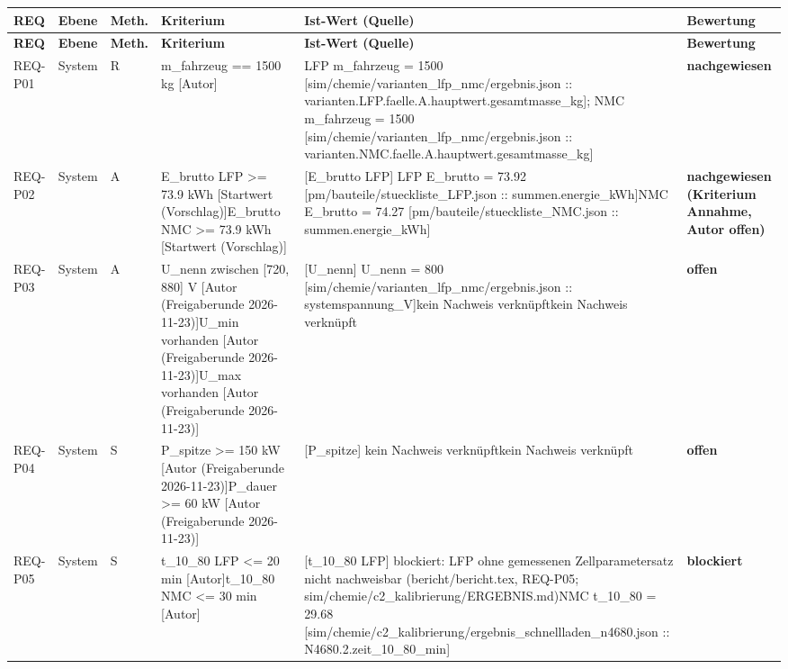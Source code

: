 \begin{longtable}{p{1.7cm}p{1.6cm}p{1.2cm}p{3.2cm}p{4.8cm}p{2.6cm}}
\toprule \textbf{REQ} & \textbf{Ebene} & \textbf{Meth.} & \textbf{Kriterium} & \textbf{Ist-Wert (Quelle)} & \textbf{Bewertung}\\\midrule\endfirsthead
\toprule \textbf{REQ} & \textbf{Ebene} & \textbf{Meth.} & \textbf{Kriterium} & \textbf{Ist-Wert (Quelle)} & \textbf{Bewertung}\\\midrule\endhead\bottomrule\endlastfoot
REQ-P01 & System & R & m\_fahrzeug == 1500 kg [Autor] & LFP m\_fahrzeug = 1500 [sim/chemie/varianten\_lfp\_nmc/ergebnis.json :: varianten.LFP.faelle.A.hauptwert.gesamtmasse\_kg]; NMC m\_fahrzeug = 1500 [sim/chemie/varianten\_lfp\_nmc/ergebnis.json :: varianten.NMC.faelle.A.hauptwert.gesamtmasse\_kg] & \textbf{nachgewiesen}\\
REQ-P02 & System & A & E\_brutto LFP >= 73.9 kWh [Startwert (Vorschlag)]\newline E\_brutto NMC >= 73.9 kWh [Startwert (Vorschlag)] & [E\_brutto LFP] LFP E\_brutto = 73.92 [pm/bauteile/stueckliste\_LFP.json :: summen.energie\_kWh] NMC E\_brutto = 74.27 [pm/bauteile/stueckliste\_NMC.json :: summen.energie\_kWh] & \textbf{nachgewiesen (Kriterium Annahme, Autor offen)}\\
REQ-P03 & System & A & U\_nenn zwischen [720, 880] V [Autor (Freigaberunde 2026-11-23)]\newline U\_min vorhanden [Autor (Freigaberunde 2026-11-23)]\newline U\_max vorhanden [Autor (Freigaberunde 2026-11-23)] & [U\_nenn] U\_nenn = 800 [sim/chemie/varianten\_lfp\_nmc/ergebnis.json :: systemspannung\_V]\newline [U\_min] kein Nachweis verknüpft\newline [U\_max] kein Nachweis verknüpft & \textbf{offen}\\
REQ-P04 & System & S & P\_spitze >= 150 kW [Autor (Freigaberunde 2026-11-23)]\newline P\_dauer >= 60 kW [Autor (Freigaberunde 2026-11-23)] & [P\_spitze] kein Nachweis verknüpft\newline [P\_dauer] kein Nachweis verknüpft & \textbf{offen}\\
REQ-P05 & System & S & t\_10\_80 LFP <= 20 min [Autor]\newline t\_10\_80 NMC <= 30 min [Autor] & [t\_10\_80 LFP] blockiert: LFP ohne gemessenen Zellparametersatz nicht nachweisbar (bericht/bericht.tex, REQ-P05; sim/chemie/c2\_kalibrierung/ERGEBNIS.md)\newline [t\_10\_80 NMC] NMC t\_10\_80 = 29.68 [sim/chemie/c2\_kalibrierung/ergebnis\_schnellladen\_n4680.json :: N4680.2.zeit\_10\_80\_min] & \textbf{blockiert}\\

\end{longtable}
